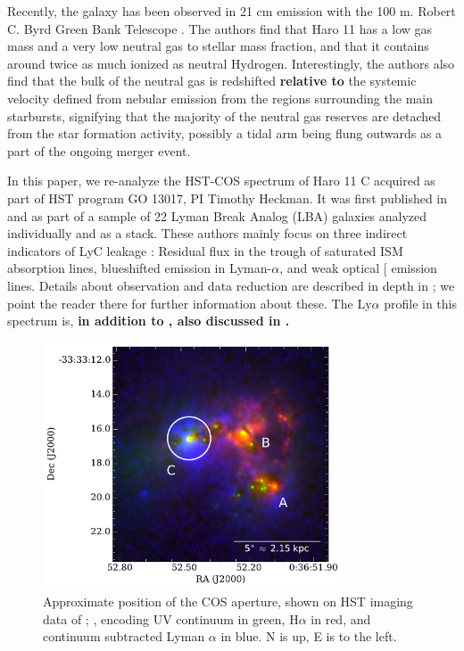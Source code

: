 \documentclass[twocolumn, trackchanges]{aastex61}
\begin{document}
Recently, the galaxy has been observed in 21 cm  emission with
the 100 m. Robert C. Byrd Green Bank Telescope \citep{Pardy2016arXiv}.
The authors find that Haro 11 has a low gas mass and a very low neutral
gas to stellar mass fraction, and that it contains around twice as much
ionized as neutral Hydrogen. Interestingly, the authors also find that
the bulk of the neutral gas is redshifted \textbf{relative to} the systemic 
velocity defined from nebular emission from the  regions surrounding
the main starbursts, signifying that the majority of the neutral gas
reserves are detached from the star formation activity, possibly a tidal
arm being flung outwards as a part of the ongoing merger event.

In this paper, we re-analyze the HST-COS spectrum of Haro 11 C acquired
as part of HST program GO 13017, PI Timothy Heckman. It was first
published in \citet{Alexandroff2015} and \citet{Heckman2015} as part of
a sample of 22 Lyman Break Analog (LBA) galaxies analyzed individually
and as a stack. These authors mainly focus on three indirect indicators
of LyC leakage \citep{Overzier2009, Heckman2011}: Residual flux in the
trough of saturated ISM absorption lines, blueshifted emission in
Lyman-$\alpha$, and weak optical {[}\ion{S}{2}{]} emission lines.
Details about observation and data reduction are described in depth in
\citet{Alexandroff2015}; we point the reader there for further
information about these. The Ly$\alpha$ profile in this spectrum is, \textbf{in
addition to \citet{Heckman2011}, also discussed in \citet{Verhamme2015}.}

\begin{figure}
\centering
\includegraphics[width=3.500in]{../Figs/Haroslit.pdf}
\caption{Approximate position of the COS aperture, shown on HST imaging
data of \citet{Hayes2009}; \citet{Ostlin2009}, encoding UV continuum in
green, H$\alpha$ in red, and continuum subtracted Lyman $\alpha$ in
blue. N is up, E is to the left.}\label{fig:apert}
\end{figure}
\end{document}
